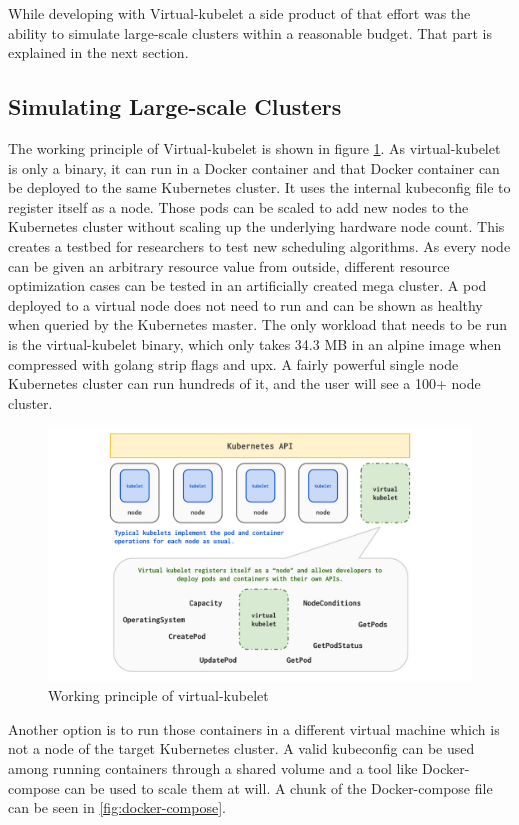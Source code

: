 While developing with Virtual-kubelet a side product of that effort was the ability to simulate large-scale clusters within a reasonable budget. That part is explained in the next section.
\subsection{Simulating Large-scale Clusters}
The working principle of Virtual-kubelet is shown in figure \ref{fig:vk}. As virtual-kubelet is only a binary, it can run in a Docker container and that Docker container can be deployed to the same Kubernetes cluster. It uses the internal kubeconfig file to register itself as a node. Those pods can be scaled to add new nodes to the Kubernetes cluster without scaling up the underlying hardware node count. This creates a testbed for researchers to test new scheduling algorithms. As every node can be given an arbitrary resource value from outside, different resource optimization cases can be tested in an artificially created mega cluster. A pod deployed to a virtual node does not need to run and can be shown as healthy when queried by the Kubernetes master. The only workload that needs to be run is the virtual-kubelet binary, which only takes 34.3 MB in an alpine image when compressed with golang strip flags and upx. A fairly powerful single node Kubernetes cluster can run hundreds of it, and the user will see a 100+ node cluster.

\begin{figure}[htpb]
  \centering
  \includegraphics[width=1\textwidth]{figures/diagram.pdf}
  \caption{Working principle of virtual-kubelet \cite{virtual}} \label{fig:vk}
\end{figure}

Another option is to run those containers in a different virtual machine which is not a node of the target Kubernetes cluster. A valid kubeconfig can be used among running containers through a shared volume and a tool like Docker-compose can be used to scale them at will. A chunk of the Docker-compose file can be seen in \ref{fig:docker-compose}.

